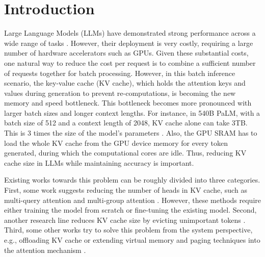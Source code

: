 \section{Introduction}

Large Language Models (LLMs) have demonstrated strong performance across a wide range of tasks \citep{gpt3,taylor2022galactica,yuan2023large,chuang2024understanding}.
However, their deployment is very costly, requiring a large number of hardware accelerators such as GPUs.
Given these substantial costs, one natural way to reduce the cost per request is to combine a sufficient number of requests together for batch processing.
However, in this batch inference scenario, the key-value cache (KV cache), which holds the attention keys and values during generation to prevent re-computations, is becoming the new memory and speed bottleneck.
This bottleneck becomes more pronounced with larger batch sizes and longer context lengths. For instance, in 540B PaLM, with a batch size of 512 and a context length of 2048, KV cache alone can take 3TB. This is 3 times the size of the model's parameters \citep{pope2023efficiently}.
Also, the GPU SRAM has to load the whole KV cache from the GPU device memory for every token generated, during which the computational cores are idle.
Thus, reducing KV cache size in LLMs while maintaining accuracy is important.


Existing works towards this problem can be roughly divided
into three categories.
First, some work suggests reducing the number of heads in KV cache, such as multi-query attention \citep{mqa} and multi-group attention \citep{gqa}.
However, these methods require either training the model from scratch or fine-tuning the existing model.
Second, another research line reduces KV cache size by evicting unimportant tokens \citep{h2o}.
Third, some other works try to solve this problem from the system perspective, e.g., offloading KV cache \citep{flexgen} or extending virtual memory and paging techniques into the attention mechanism \citep{vllm}.

